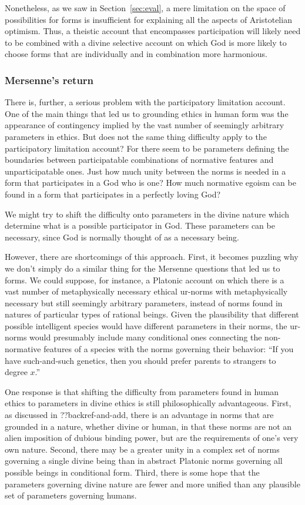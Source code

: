 Nonetheless, as we saw in Section~\ref{sec:eval}, a mere limitation on the space of possibilities for forms is insufficient for explaining all the aspects of Aristotelian optimism. Thus, a theistic account that encompasses
participation will likely need to be combined with a divine selective account on which God is more likely to
choose forms that are individually and in combination more harmonious.

\subsubsection{Mersenne's return}\label{sec:limited-pl}
There is, further, a serious problem with the participatory limitation account. One of the main things that led us to grounding ethics
in human form was the appearance of contingency implied by the vast number of seemingly arbitrary parameters in ethics. But does not 
the same thing difficulty apply to the participatory limitation account? For there seem to be parameters defining the boundaries between
participatable combinations of normative features and unparticipatable ones. Just how much unity between the norms is needed in a form
that participates in a God who is one? How much normative egoism can be found in a form that participates in a perfectly loving God?

We might try to shift the difficulty onto parameters in the divine nature which determine what is a possible participator in God.
These parameters can be necessary, since God is normally thought of as a necessary being. 

However, there are shortcomings of this approach. First, it becomes puzzling why we don't simply do a similar thing for the Mersenne questions that 
led us to forms. We could suppose, for instance, a Platonic account on which there is a vast number of metaphysically necessary ethical ur-norms
with metaphysically necessary but still seemingly arbitrary parameters, instead of norms found in natures of particular types of 
rational beings. Given the plausibility that different possible intelligent species would have different parameters in their norms, 
the ur-norms would presumably include many conditional ones connecting the non-normative features of a species with the norms governing
their behavior: ``If you have such-and-such genetics, then you should prefer parents to strangers to degree $x$.'' 

One response is that shifting the difficulty from parameters found in human ethics to parameters in divine ethics is still philosophically
advantageous. First, as discussed in ??backref-and-add, there is an advantage in norms that are grounded in a nature, whether divine or human, 
in that these norms are not an alien imposition of dubious binding power, but are the requirements of one's very own nature. Second, there may
be a greater unity in a complex set of norms governing a single divine being than in abstract Platonic norms governing all possible beings
in conditional form. Third, there is some hope that the parameters governing divine nature are fewer and more unified than any plausible set 
of parameters governing humans. 

